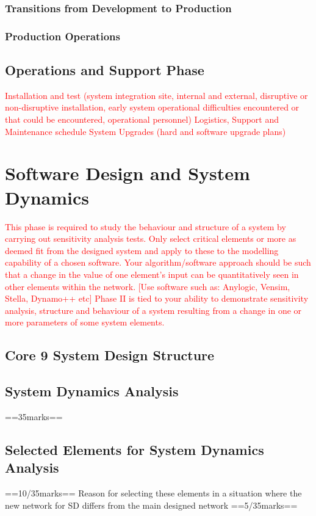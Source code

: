 \documentclass[a4paper,11pt,fleqn]{report}
\begin{document}
\subsection{Transitions from Development to Production}

\subsection{Production Operations}

\section{Operations and Support Phase}
\textcolor{red}{Installation and test (system integration site, internal and external, disruptive or non-disruptive installation, early system operational difficulties encountered or that could be encountered, operational personnel)
Logistics, Support and Maintenance schedule
System Upgrades (hard and software upgrade plans)}

\chapter{Software Design and System Dynamics}
\textcolor{red}{This phase is required to study the behaviour and structure of a system by carrying out sensitivity analysis tests. Only select critical elements or more as deemed fit from the designed system and apply to these to the modelling capability of a chosen software.
Your algorithm/software approach should be such that a change in the value of one element’s input can be quantitatively seen in other elements within the network. [Use software such as: Anylogic, Vensim, Stella, Dynamo++ etc]
Phase II is tied to your ability to demonstrate sensitivity analysis, structure and behaviour of a system resulting from a change in one or more parameters of some system elements.}

\section{Core 9 System Design Structure}

\section{System Dynamics Analysis}
==35marks==

\section{Selected Elements for System Dynamics Analysis}
==10/35marks==
Reason for selecting these elements in a situation where the new network for SD differs from the main designed network ==5/35marks==
\end{document}
